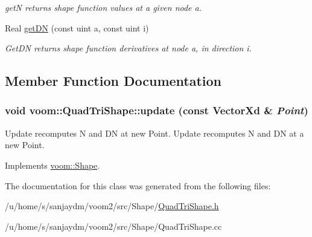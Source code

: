 \begin{DoxyCompactItemize}
\begin{DoxyCompactList}\small\item\em getN returns shape function values at a given node a. \item\end{DoxyCompactList}\item 
\hypertarget{classvoom_1_1_quad_tri_shape_aa8b93b502aee6e577ae0cc769018abea}{
Real \hyperlink{classvoom_1_1_quad_tri_shape_aa8b93b502aee6e577ae0cc769018abea}{getDN} (const uint a, const uint i)}
\label{classvoom_1_1_quad_tri_shape_aa8b93b502aee6e577ae0cc769018abea}

\begin{DoxyCompactList}\small\item\em GetDN returns shape function derivatives at node a, in direction i. \item\end{DoxyCompactList}\end{DoxyCompactItemize}


\subsection{Member Function Documentation}
\hypertarget{classvoom_1_1_quad_tri_shape_a1e0317d601f43cced80377e60db19b49}{
\subsubsection[{update}]{\setlength{\rightskip}{0pt plus 5cm}void voom::QuadTriShape::update (const VectorXd \& {\em Point})}}
\label{classvoom_1_1_quad_tri_shape_a1e0317d601f43cced80377e60db19b49}


Update recomputes N and DN at new Point. Update recomputes N and DN at a new Point. 

Implements \hyperlink{classvoom_1_1_shape_a8ded544de12647543b056cec61be9f26}{voom::Shape}.

The documentation for this class was generated from the following files:\begin{DoxyCompactItemize}
\item 
/u/home/s/sanjaydm/voom2/src/Shape/\hyperlink{_quad_tri_shape_8h}{QuadTriShape.h}\item 
/u/home/s/sanjaydm/voom2/src/Shape/QuadTriShape.cc\end{DoxyCompactItemize}
